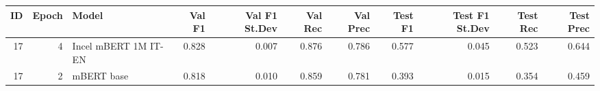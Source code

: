 \begin{tabular}{rrlrrrrrrrr}
\toprule
 ID &  Epoch &                Model &  Val F1 &  Val F1 St.Dev &  Val Rec &  Val Prec &  Test F1 &  Test F1 St.Dev &  Test Rec &  Test Prec \\
\midrule
 17 &      4 & Incel mBERT 1M IT-EN &   0.828 &          0.007 &    0.876 &     0.786 &    0.577 &           0.045 &     0.523 &      0.644 \\
 17 &      2 &           mBERT base &   0.818 &          0.010 &    0.859 &     0.781 &    0.393 &           0.015 &     0.354 &      0.459 \\
\bottomrule
\end{tabular}
